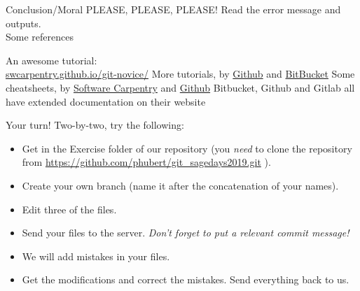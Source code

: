 \documentclass{beamer}
\begin{document}
	\begin{frame}{Conclusion/Moral}
	PLEASE, PLEASE, PLEASE! Read the error message and outputs.\\
	\vspace{1em}
	\pause
	{\Large Some references}
	\begin{thebibliography}{99}
		 An awesome tutorial:\\ \url{swcarpentry.github.io/git-novice/}
		 More tutorials, by \href{https://guides.github.com/introduction/git-handbook/}{Github} and \href{https://www.atlassian.com/git/tutorials/learn-git-with-bitbucket-cloud}{BitBucket}
		 Some cheatsheets, by  \href{swcarpentry.github.io/git-novice/reference.html}{Software Carpentry} and \href{https://github.github.com/training-kit/downloads/github-git-cheat-sheet.pdf}{Github}
		 Bitbucket, Github and Gitlab all have extended documentation on their website
	\end{thebibliography}
	\end{frame}

	\begin{frame}{Your turn!}
	Two-by-two, try the following:
		\begin{itemize}
			\item Get in the Exercise folder of our repository (you \textit{need} to clone the repository from \url{https://github.com/phubert/git_sagedays2019.git} ).
			\item Create your own branch (name it after the concatenation of your names).
			\item Edit three of the files.
			\item Send your files to the server. \textit{Don't forget to put a relevant commit message!}
			\item We will add mistakes in your files.
			\item Get the modifications and correct the mistakes. Send everything back to us.
		\end{itemize}
	\end{frame}
\end{document}
